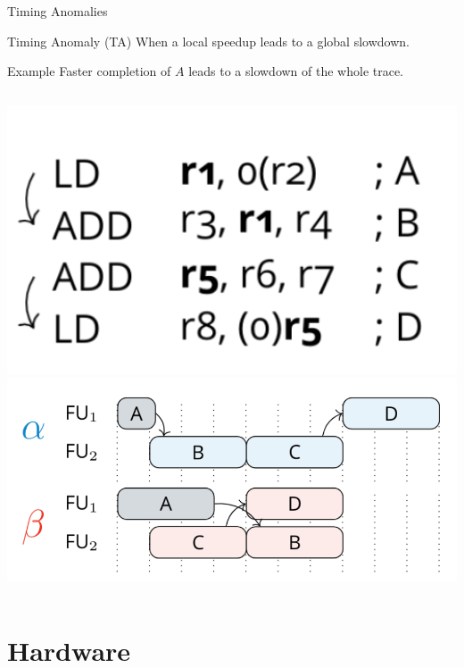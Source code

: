 \documentclass{beamer}
\begin{document}
\begin{frame}{Timing Anomalies}
    \begin{block}{Timing Anomaly (TA)}
        When a local speedup leads to a global slowdown.
    \end{block}

    \begin{exampleblock}{Example}
        Faster completion of $A$ leads to a slowdown of the whole trace. 
    \end{exampleblock}

    \begin{columns}
        \includegraphics[width=1\textwidth]{pic/first-TA-ex-input.png}
        \includegraphics[width=1\textwidth]{pic/first-TA-ex-trace.png}
    \end{columns}
\end{frame}

% 

\section{Hardware}
\end{document}
